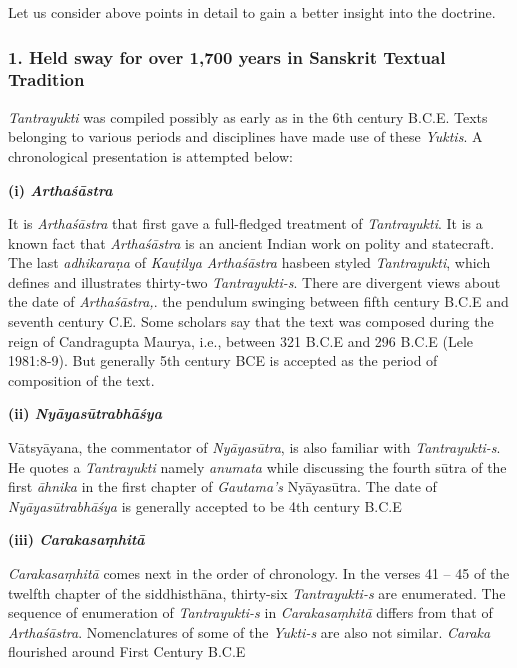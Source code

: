 Let us consider above points in detail to gain a better insight into the doctrine.

\subsubsection*{1. Held sway for over 1,700 years in Sanskrit Textual Tradition}

\textit{Tantrayukti} was compiled possibly as early as in the 6th century B.C.E. Texts belonging to various periods and disciplines have made use of these \textit{Yuktis}. A chronological presentation is attempted below:

\textbf{(i) \textit{Arthaśāstra}}

It is \textit{Arthaśāstra} that first gave a full-fledged treatment of \textit{Tantrayukti}. It is a known fact that \textit{Arthaśāstra} is an ancient Indian work on polity and statecraft. The last \textit{adhikaraṇa} of \textit{Kauṭilya Arthaśāstra} has\break been styled \textit{Tantrayukti}, which defines and illustrates thirty-two \textit{Tantrayukti-s}. There are divergent views about the date of \textit{Arthaśāstra,}. the pendulum swinging between fifth century B.C.E and seventh century C.E. Some scholars say that the text was composed during the reign of Candragupta Maurya, i.e., between 321 B.C.E and 296 B.C.E (Lele 1981:8-9). But generally 5th century BCE is accepted as the period of composition of the text.

\textbf{(ii) \textit{Nyāyasūtrabhāśya}}

Vātsyāyana, the commentator of \textit{Nyāyasūtra}, is also familiar with \textit{Tantrayukti-s}. He quotes a \textit{Tantrayukti} namely \textit{anumata} while discussing the fourth sūtra of the first \textit{āhnika} in the first chapter of \textit{Gautama’s} Nyāyasūtra. The date of \textit{Nyāyasūtrabhāśya} is generally accepted to be 4th century B.C.E

\textbf{(iii) \textit{Carakasaṃhitā}}

\textit{Carakasaṃhitā} comes next in the order of chronology. In the verses 41 – 45 of the twelfth chapter of the siddhisthāna, thirty-six \textit{Tantrayukti-s} are enumerated. The sequence of enumeration of \textit{Tantrayukti-s} in \textit{Carakasaṃhitā} differs from that of \textit{Arthaśāstra}. Nomenclatures of some of the \textit{Yukti-s} are also not similar. \textit{Caraka} flourished around First Century B.C.E

